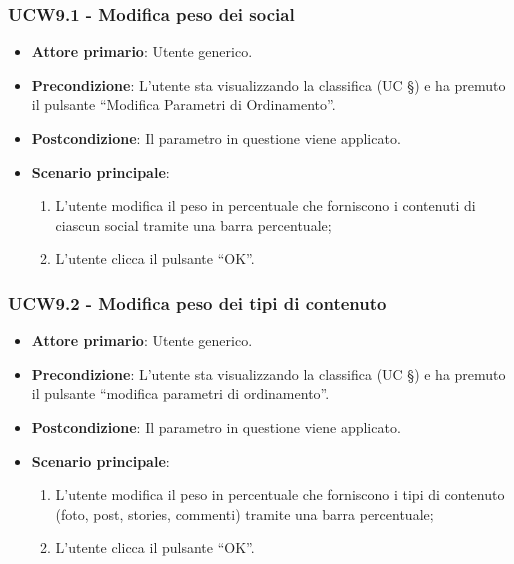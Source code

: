 \subsubsection{UCW9.1 - Modifica peso dei social }
\begin{itemize}
    \item \textbf{Attore primario}: Utente generico.
    \item \textbf{Precondizione}: L’utente sta visualizzando la classifica (UC §) e ha premuto il pulsante “Modifica Parametri di Ordinamento”.
    \item \textbf{Postcondizione}: Il parametro in questione viene applicato.
    \item \textbf{Scenario principale}: 
    \begin{enumerate}
        \item L’utente modifica il peso in percentuale che forniscono i contenuti di ciascun social tramite una barra percentuale;
        \item L’utente clicca il pulsante “OK”.
    \end{enumerate}
\end{itemize}

\subsubsection{UCW9.2 - Modifica peso dei tipi di contenuto}
\begin{itemize}
    \item \textbf{Attore primario}: Utente generico.
    \item \textbf{Precondizione}: L’utente sta visualizzando la classifica (UC §) e ha premuto il pulsante “modifica parametri di ordinamento”.
    \item \textbf{Postcondizione}: Il parametro in questione viene applicato.
    \item \textbf{Scenario principale}: 
    \begin{enumerate}
        \item L’utente modifica il peso in percentuale che forniscono i tipi di contenuto (foto, post, stories, commenti) tramite una barra percentuale;
        \item L’utente clicca il pulsante “OK”.
    \end{enumerate}
\end{itemize}